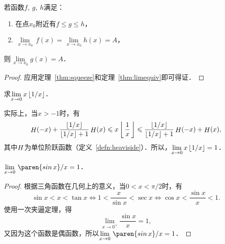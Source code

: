 \begin{theorem}[函数极限的夹逼定理]
  \label{thm:funcsqueeze}
  若函数\(f,\ g,\ h\)满足：
  \begin{enumerate}[topsep=0ex,itemsep=0ex]
    \renewcommand{\labelenumi}{\enumparen{\arabic{enumi}}}
  \item 在点\(x_0\)附近有\(f \le g \le h\)，
  \item \(\lim\limits_{\,x \to x_0\!} \,f(x) = \lim\limits_{\,x \to x_0\!} h(x) = A\)，
  \end{enumerate}
  则\(\!\lim\limits_{\,x \to x_0\!} g(x) = A\)．

  \begin{proof}
    应用定理~\ref{thm:squeeze}和定理~\ref{thm:limequiv}即可得证．
  \end{proof}
\end{theorem}

\begin{example*}
  求\(\lim\limits_{x\to0} x \, \lfloor1/x\rfloor\)．

  \begin{remark}
    实际上，当\(x > -1\)时，有
    \begin{equation*}
      \Fn H(-x) + \frac{\floor{1/x}}{\floor{1/x}+1} \Fn H(x)
      \le
      x \, \floor[\bigg]{\,\frac1x\,}
      \le
      \frac{\floor{1/x}}{\floor{1/x}+1} \Fn H(-x) + \Fn H(x),
    \end{equation*}
    其中\(\mathop{\relax H}\nolimits\)为单位阶跃函数（定义~\ref{defn:heaviside}）．所以，\(\lim\limits_{x\to0} x \, \lfloor1/x\rfloor = 1\)．
  \end{remark}
\end{example*}

\begin{theorem*}
  \(\lim\limits_{x\to0} \,\paren{\sin x}/{x} = 1\)．

  \begin{proof}
    根据三角函数在几何上的意义，当\(0 < x < \pi/2\)时，有
    \begin{equation*}
      \sin x < x < \tan x
      \iff
      1 < \frac{x}{\sin x} < \sec x
      \iff
      \cos x < \frac{\sin x}{x} < 1.
    \end{equation*}
    使用一次夹逼定理，得
    \begin{equation*}
      \lim_{x\to0^+\!} \! \frac{\sin x}{x} = 1,
    \end{equation*}
    又因为这个函数是偶函数，所以\(\lim\limits_{x\to0} \,\paren{\sin x}/{x} = 1\)．
  \end{proof}
\end{theorem*}

